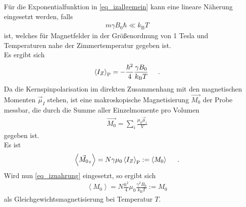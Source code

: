 \documentclass[]{scrartcl}
\begin{document}
Für die Exponentialfunktion in \ref{eq_izallgemein} kann eine lineare Näherung eingesetzt werden, falls
\begin{align}
m\gamma B_0 \hbar \ll k_\text{B}T 
\end{align}
ist, welches für Magnetfelder in der Größenordnung von 1 Tesla und Temperaturen nahe der Zimmertemperatur gegeben ist.\\
Es ergibt sich
\begin{align}
\left\langle I_Z \right\rangle_{\text{P}}= -\frac{\hbar^2}{4}\frac{\gamma B_0}{k_\text{B}T}\hspace*{0.5cm}\text{.} \label{eq_iznahrung}
\end{align}
Da die Kernspinpolarisation im direkten Zusammenhang mit den magnetischen Momenten $\vec{\mu}_I$ stehen, ist eine makroskopische Magnetisierung $\vec{M_0}$ der Probe messbar, die durch die Summe aller Einzelmomente pro Volumen
\begin{align}
\vec{M_0}=\sum\limits_{i}^{}\frac{\mu_0\vec{\mu}_i}{V}
\end{align}
gegeben ist.\\
Es ist
\begin{align}
\left\langle \vec{M_0}_z \right\rangle =N\gamma \mu_0 \left\langle I_Z \right\rangle_{\text{P}} :=\left\langle M_0 \right\rangle\hspace*{0.5cm}\text{.}
\end{align}
Wird nun \ref{eq_iznahrung} eingesetzt, so ergibt sich
\begin{align}
\left\langle M_0 \right\rangle = N\frac{\hbar^2}{4}\mu_0\frac{\gamma^2 B_0}{k_\text{B}T}:=M_0
\end{align}
als Gleichgewichtsmagnetisierung bei Temperatur $T$.
\end{document}
